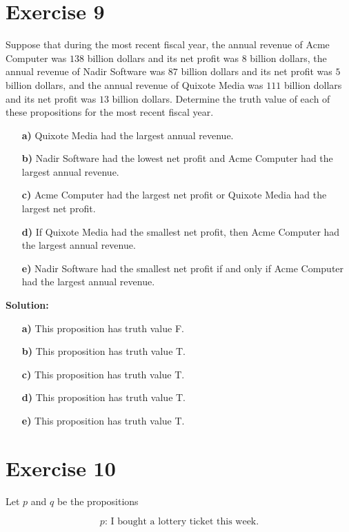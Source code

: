 \documentclass{Axon}
\begin{document}
\section*{Exercise 9}
Suppose that during the most recent fiscal year, the annual revenue of Acme Computer was \(138\) billion dollars and its net profit was \(8\) billion dollars, the annual revenue of Nadir Software was \(87\) billion dollars and its net profit was \(5\) billion dollars, and the annual revenue of Quixote Media was \(111\) billion dollars and its net profit was \(13\) billion dollars. Determine the truth value of each of these propositions for the most recent fiscal year.
\begin{enumerate}
    \item[\textbf{a)}] Quixote Media had the largest annual revenue.
    \item[\textbf{b)}] Nadir Software had the lowest net profit and Acme Computer had the largest annual revenue.
    \item[\textbf{c)}] Acme Computer had the largest net profit or Quixote Media had the largest net profit.
    \item[\textbf{d)}] If Quixote Media had the smallest net profit, then Acme Computer had the largest annual revenue.
    \item[\textbf{e)}] Nadir Software had the smallest net profit if and only if Acme Computer had the largest annual revenue.
\end{enumerate}

\noindent
\textbf{Solution:}\begin{enumerate}
    \item[\textbf{a)}] This proposition has truth value F.
    \item[\textbf{b)}] This proposition has truth value T.
    \item[\textbf{c)}] This proposition has truth value T.
    \item[\textbf{d)}] This proposition has truth value T.
    \item[\textbf{e)}] This proposition has truth value T.
\end{enumerate}

\section*{Exercise 10}
Let \(p\) and \(q\) be the propositions

\begin{equation*}
    p\text{: I bought a lottery ticket this week.}
\end{equation*}
\end{document}
